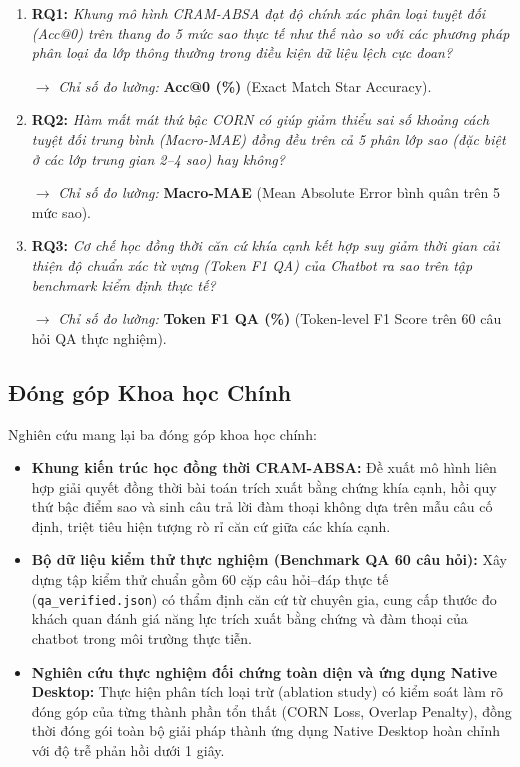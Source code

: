 \documentclass[pdflatex,sn-mathphys-num]{sn-jnl}
\theoremstyle{thmstyleone}
\theoremstyle{thmstyletwo}
\theoremstyle{thmstylethree}
\begin{document}
\begin{enumerate}
    \item \textbf{RQ1:} \textit{Khung mô hình CRAM-ABSA đạt độ chính xác phân loại tuyệt đối (Acc@0) trên thang đo 5 mức sao thực tế như thế nào so với các phương pháp phân loại đa lớp thông thường trong điều kiện dữ liệu lệch cực đoan?}
    
    $\rightarrow$ \textit{Chỉ số đo lường:} \textbf{Acc@0 (\%)} (Exact Match Star Accuracy).

    \item \textbf{RQ2:} \textit{Hàm mất mát thứ bậc CORN có giúp giảm thiểu sai số khoảng cách tuyệt đối trung bình (Macro-MAE) đồng đều trên cả 5 phân lớp sao (đặc biệt ở các lớp trung gian 2--4 sao) hay không?}
    
    $\rightarrow$ \textit{Chỉ số đo lường:} \textbf{Macro-MAE} (Mean Absolute Error bình quân trên 5 mức sao).

    \item \textbf{RQ3:} \textit{Cơ chế học đồng thời căn cứ khía cạnh kết hợp suy giảm thời gian cải thiện độ chuẩn xác từ vựng (Token F1 QA) của Chatbot ra sao trên tập benchmark kiểm định thực tế?}
    
    $\rightarrow$ \textit{Chỉ số đo lường:} \textbf{Token F1 QA (\%)} (Token-level F1 Score trên 60 câu hỏi QA thực nghiệm).
\end{enumerate}

\subsection{Đóng góp Khoa học Chính}
\label{subsec:key_contributions}
Nghiên cứu mang lại ba đóng góp khoa học chính:

\begin{itemize}
    \item \textbf{Khung kiến trúc học đồng thời CRAM-ABSA:} Đề xuất mô hình liên hợp giải quyết đồng thời bài toán trích xuất bằng chứng khía cạnh, hồi quy thứ bậc điểm sao và sinh câu trả lời đàm thoại không dựa trên mẫu câu cố định, triệt tiêu hiện tượng rò rỉ căn cứ giữa các khía cạnh.

    \item \textbf{Bộ dữ liệu kiểm thử thực nghiệm (Benchmark QA 60 câu hỏi):} Xây dựng tập kiểm thử chuẩn gồm 60 cặp câu hỏi--đáp thực tế (\texttt{qa\_verified.json}) có thẩm định căn cứ từ chuyên gia, cung cấp thước đo khách quan đánh giá năng lực trích xuất bằng chứng và đàm thoại của chatbot trong môi trường thực tiễn.

    \item \textbf{Nghiên cứu thực nghiệm đối chứng toàn diện và ứng dụng Native Desktop:} Thực hiện phân tích loại trừ (ablation study) có kiểm soát làm rõ đóng góp của từng thành phần tổn thất (CORN Loss, Overlap Penalty), đồng thời đóng gói toàn bộ giải pháp thành ứng dụng Native Desktop hoàn chỉnh với độ trễ phản hồi dưới 1 giây.
\end{itemize}
\end{document}
